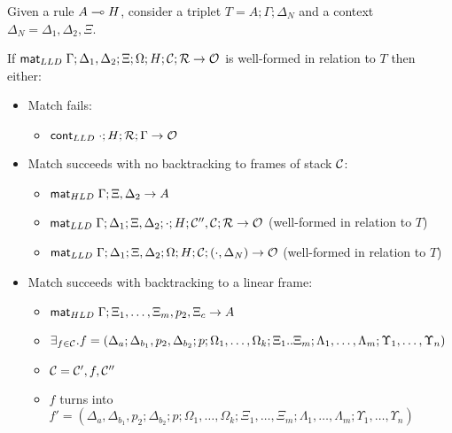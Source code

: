 \begin{lemma}\label{thm:body_match}
   
Given a rule $A \multimap H$, consider a triplet $T = A; \Gamma; \Delta_{N}$ and a
context $\Delta_{N} = \Delta_1, \Delta_2, \Xi$.

If $\mathsf{mat}_{LLD} \; \Gamma; \Delta_1, \Delta_2; \Xi; \Omega; H; \mathcal{C}; \mathcal{R}
\rightarrow \mathcal{O}$ is well-formed in relation to $T$ then either:

\begin{itemize}[leftmargin=*]
   \item Match fails:
   \begin{itemize}[leftmargin=\secondm]
      \item $\mathsf{cont}_{LLD} \; \cdot; H; \mathcal{R}; \Gamma \rightarrow \mathcal{O}$
   \end{itemize}

   \item Match succeeds with no backtracking to frames of stack $\mathcal{C}$:
   \begin{itemize}[leftmargin=\secondm]
      \item $\mathsf{mat}_{HLD} \; \Gamma; \Xi, \Delta_2 \rightarrow A$
      \item $\mathsf{mat}_{LLD} \; \Gamma; \Delta_1; \Xi, \Delta_2; \cdot; H; \mathcal{C''},
   \mathcal{C}; \mathcal{R}
         \rightarrow \mathcal{O}$ (well-formed in relation to $T$)
      \item $\mathsf{mat}_{LLD} \; \Gamma; \Delta_1; \Xi, \Delta_2; \Omega; H; \mathcal{C}; (\cdot, \Delta_N) \rightarrow \mathcal{O}$ (well-formed in relation to $T$)
   \end{itemize}

   \item Match succeeds with backtracking to a linear frame:
   \begin{itemize}[leftmargin=\secondm]
      \item $\mathsf{mat}_{HLD} \; \Gamma; \Xi_1, \dotsc, \Xi_m, p_2, \Xi_c \rightarrow A$
      \item $\exists_{f \in \mathcal{C}}. f = (\Delta_a; \Delta_{b_1}, p_2, \Delta_{b_2}; p;
            \Omega_1, \dotsc, \Omega_k; \Xi_1 .. \Xi_m; \Lambda_1, \dotsc,
            \Lambda_m; \Upsilon_1, \dotsc, \Upsilon_n)$

      \item $\mathcal{C} = \mathcal{C'}, f, \mathcal{C''}$

      \item $f$ turns into $f' = (\Delta_a, \Delta_{b_1}, p_2;
            \Delta_{b_2}; p; \Omega_1, \dotsc, \Omega_k; \Xi_1, \dotsc, \Xi_m;
            \Lambda_1, \dotsc, \Lambda_m; \Upsilon_1, \dotsc, \Upsilon_n)$


\end{itemize}
\end{itemize}
\end{lemma}
